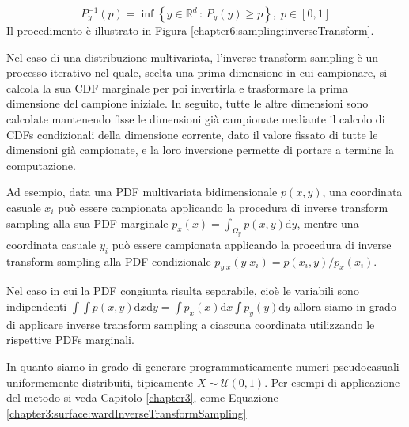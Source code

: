 \begin{equation}
	P_y^{-1}(p)=\inf\left\{y\in\mathbb{R}^d\,:\,P_y(y)\geq p\right\},\;p\in[0,1]
\end{equation}
Il procedimento \`e illustrato in Figura \ref{chapter6:sampling:inverseTransform}.\par
Nel caso di una distribuzione multivariata, l'inverse transform sampling \`e un processo iterativo nel quale, scelta una prima dimensione in cui
campionare, si calcola la sua CDF marginale per poi invertirla e trasformare la prima dimensione del campione iniziale. In seguito, tutte le 
altre dimensioni sono calcolate mantenendo fisse le dimensioni gi\`a campionate mediante il calcolo di CDFs condizionali della dimensione corrente, 
dato il valore fissato di tutte le dimensioni gi\`a campionate, e la loro inversione permette di portare a termine la computazione.\par
Ad esempio, data una PDF multivariata bidimensionale $p(x,y)$, una coordinata casuale $x_i$ pu\`o essere campionata applicando la procedura di 
inverse transform sampling alla sua PDF marginale $p_x(x)=\int_{\Omega_y}p(x,y)\mathrm{d}y$, mentre una coordinata casuale $y_i$ pu\`o essere 
campionata applicando la procedura di inverse transform sampling alla PDF condizionale $p_{y|x}(y|x_i)=p(x_i,y) / p_x(x_i)$.\par
Nel caso in cui la PDF congiunta risulta separabile, cio\`e le variabili sono indipendenti 
\mbox{$\int\int p(x,y)\mathrm{d}x\mathrm{d}y=\int p_x(x)\mathrm{d}x\int p_y(y)\mathrm{d}y$} allora siamo in grado di applicare inverse transform 
sampling a ciascuna coordinata utilizzando le rispettive PDFs marginali.\par
In quanto siamo in grado di generare programmaticamente numeri pseudocasuali uniformemente distribuiti, tipicamente $X\sim\mathcal{U}(0,1)$. 
Per esempi di applicazione del metodo si veda Capitolo \ref{chapter3}, come Equazione \ref{chapter3:surface:wardInverseTransformSampling}
